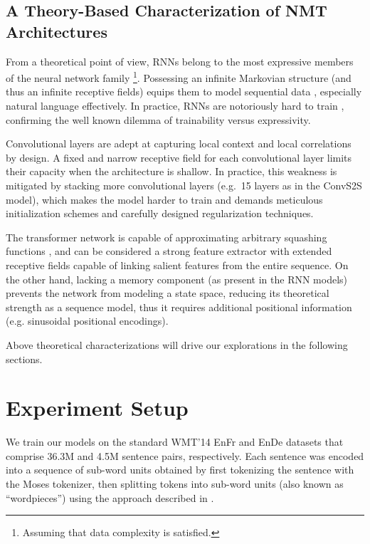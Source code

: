 \documentclass[11pt,a4paper]{article}
\begin{document}
\subsection{A Theory-Based Characterization of NMT Architectures}

From a theoretical point of view, RNNs belong to the most expressive
members of the neural network family \cite{SIEGELMANN1995132}\footnote{Assuming that data
complexity is satisfied.}. Possessing an infinite Markovian structure (and thus
an infinite receptive fields) equips them to model sequential data \cite{ELMAN1990179},
especially natural language \cite{Grefenstette:2015:LTU:2969442.2969444} effectively.
In practice, RNNs are notoriously hard to train \cite{Bengio:1994:LLD:2325857.2328340},
confirming the well known dilemma of trainability versus expressivity.


Convolutional layers are adept at capturing local context and local
correlations by design. A fixed and narrow receptive field for each
convolutional layer limits their capacity when the architecture is shallow. In
practice, this weakness is mitigated by stacking
more convolutional layers (e.g.~15 layers as in the
ConvS2S model), which makes the model harder to train and
demands meticulous initialization schemes and carefully designed
regularization techniques.



The transformer network is capable of approximating arbitrary squashing
functions \cite{HORNIK1989359}, and can be considered a strong
feature extractor with extended receptive fields capable of linking salient
features from the entire sequence. On the other hand, lacking a memory component
(as present in the RNN models) prevents the network from modeling a state space,
reducing its theoretical strength as a sequence model, thus it requires
additional positional information (e.g. sinusoidal positional encodings).

Above theoretical characterizations will drive our explorations in the
following sections.





\section{Experiment Setup}
\label{sec:eval}
\vspace{-5px}
We train our models on the standard WMT'14 EnFr and EnDe
datasets that comprise 36.3M and 4.5M sentence pairs, respectively.
Each sentence was encoded into a sequence of sub-word units obtained
by first tokenizing the sentence with the Moses tokenizer, then splitting tokens into sub-word
units (also known as ``wordpieces'')  using the approach described in \cite{wordpiece_schuster}.
\end{document}
